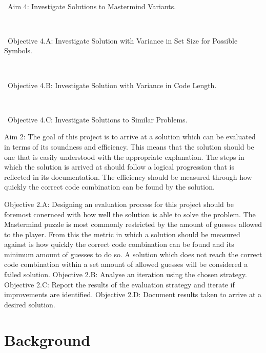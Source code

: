 \documentclass[12pt]{article}  %
\theoremstyle{definition}
\theoremstyle{remark}
\begin{document}
\

\textbullet\ Aim 4: Investigate Solutions to Mastermind Variants.

\

\textbullet\ Objective 4.A: Investigate Solution with Variance in Set Size for Possible Symbols.

\

\textbullet\ Objective 4.B: Investigate Solution with Variance in Code Length.

\

\textbullet\ Objective 4.C: Investigate Solutions to Similar Problems.



{Aim 2: The goal of this project is to arrive at a solution which can be evaluated in terms of its soundness and efficiency. This means that the solution should be one that is easily understood with the appropriate explanation. The steps in which the solution is arrived at should follow a logical progression that is reflected in its documentation. The efficiency should be measured through how quickly the correct code combination can be found by the solution.}

{Objective 2.A: Designing an evaluation process for this project should be foremost conernced with how well the solution is able to solve the problem. The Mastermind puzzle is most commonly restricted by the amount of guesses allowed to the player. From this the metric in which a solution should be measured against is how quickly the correct code combination can be found and its minimum amount of guesses to do so. A solution which does not reach the correct code combination within a set amount of allowed guesses will be considered a failed solution.}
{Objective 2.B: Analyse an iteration using the chosen strategy.}
{Objective 2.C: Report the results of the evaluation strategy and iterate if improvements are identified.}
{Objective 2.D: Document results taken to arrive at a desired solution.}   



%

\newpage                     %
\section{Background}\label{ss:back}
\end{document}
